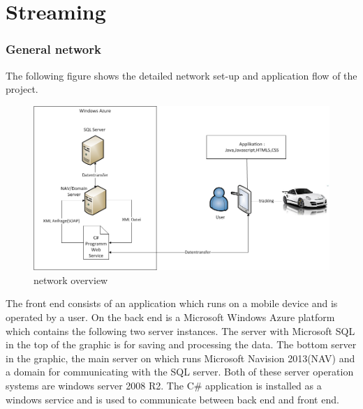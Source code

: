 \chapter{Streaming} \label{chapter:Streaming}
\subsection{General network}
The following figure shows the detailed network set-up and application flow of the project.
\begin{figure}[htbp]
\centering
\includegraphics[width=\textwidth,height=\textheight,keepaspectratio]
{graphics/networkoverview.png}
\caption{network overview}
\end{figure}

The front end consists of an application which runs on a mobile device and is operated by a user. On the back end is a Microsoft Windows Azure platform which contains the following two server instances. The server with Microsoft SQL in the top of the graphic is for saving and processing the data. The bottom server in the graphic, the main server on which runs Microsoft Navision 2013(NAV) and a domain for communicating with the SQL server. Both of these server operation systems are windows server 2008 R2. The C\# application is installed as a windows service and is used to communicate between back end and front end.

